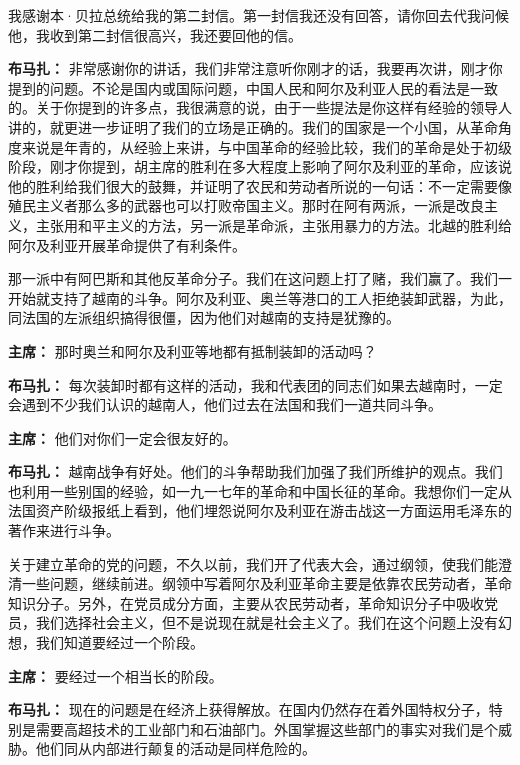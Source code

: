 \begin{duihua}
我感谢本·贝拉总统给我的第二封信。第一封信我还没有回答，请你回去代我问候他，我收到第二封信很高兴，我还要回他的信。

\item[\textbf{布马扎：}] 非常感谢你的讲话，我们非常注意听你刚才的话，我要再次讲，刚才你提到的问题。不论是国内或国际问题，中国人民和阿尔及利亚人民的看法是一致的。关于你提到的许多点，我很满意的说，由于一些提法是你这样有经验的领导人讲的，就更进一步证明了我们的立场是正确的。我们的国家是一个小国，从革命角度来说是年青的，从经验上来讲，与中国革命的经验比较，我们的革命是处于初级阶段，刚才你提到，胡主席的胜利在多大程度上影响了阿尔及利亚的革命，应该说他的胜利给我们很大的鼓舞，并证明了农民和劳动者所说的一句话：不一定需要像殖民主义者那么多的武器也可以打败帝国主义。那时在阿有两派，一派是改良主义，主张用和平主义的方法，另一派是革命派，主张用暴力的方法。北越的胜利给阿尔及利亚开展革命提供了有利条件。

那一派中有阿巴斯和其他反革命分子。我们在这问题上打了赌，我们赢了。我们一开始就支持了越南的斗争。阿尔及利亚、奥兰等港口的工人拒绝装卸武器，为此，同法国的左派组织搞得很僵，因为他们对越南的支持是犹豫的。

\item[\textbf{主席：}] 那时奥兰和阿尔及利亚等地都有抵制装卸的活动吗？

\item[\textbf{布马扎：}] 每次装卸时都有这样的活动，我和代表团的同志们如果去越南时，一定会遇到不少我们认识的越南人，他们过去在法国和我们一道共同斗争。

\item[\textbf{主席：}] 他们对你们一定会很友好的。

\item[\textbf{布马扎：}] 越南战争有好处。他们的斗争帮助我们加强了我们所维护的观点。我们也利用一些别国的经验，如一九一七年的革命和中国长征的革命。我想你们一定从法国资产阶级报纸上看到，他们埋怨说阿尔及利亚在游击战这一方面运用毛泽东的著作来进行斗争。

关于建立革命的党的问题，不久以前，我们开了代表大会，通过纲领，使我们能澄清一些问题，继续前进。纲领中写着阿尔及利亚革命主要是依靠农民劳动者，革命知识分子。另外，在党员成分方面，主要从农民劳动者，革命知识分子中吸收党员，我们选择社会主义，但不是说现在就是社会主义了。我们在这个问题上没有幻想，我们知道要经过一个阶段。

\item[\textbf{主席：}] 要经过一个相当长的阶段。

\item[\textbf{布马扎：}] 现在的问题是在经济上获得解放。在国内仍然存在着外国特权分子，特别是需要高超技术的工业部门和石油部门。外国掌握这些部门的事实对我们是个威胁。他们同从内部进行颠复的活动是同样危险的。


\end{duihua}
